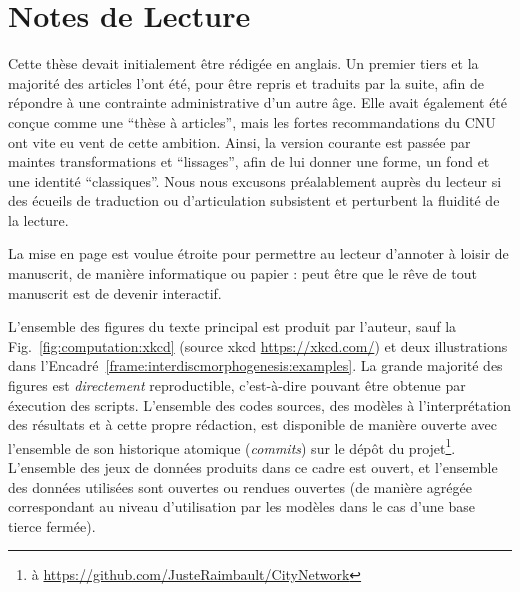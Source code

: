 



\begingroup
\let\clearpage\relax
\let\cleardoublepage\relax
\let\cleardoublepage\relax


\chapter*{Notes de Lecture}



Cette thèse devait initialement être rédigée en anglais. Un premier tiers et la majorité des articles l'ont été, pour être repris et traduits par la suite, afin de répondre à une contrainte administrative d'un autre âge. Elle avait également été conçue comme une ``thèse à articles'', mais les fortes recommandations du CNU ont vite eu vent de cette ambition. Ainsi, la version courante est passée par maintes transformations et ``lissages'', afin de lui donner une forme, un fond et une identité ``classiques''. Nous nous excusons préalablement auprès du lecteur si des écueils de traduction ou d'articulation subsistent et perturbent la fluidité de la lecture.

La mise en page est voulue étroite pour permettre au lecteur d'annoter à loisir de manuscrit, de manière informatique ou papier : peut être que le rêve de tout manuscrit est de devenir interactif.

L'ensemble des figures du texte principal est produit par l'auteur, sauf la Fig.~\ref{fig:computation:xkcd} (source xkcd \url{https://xkcd.com/}) et deux illustrations dans l'Encadré~\ref{frame:interdiscmorphogenesis:examples}. La grande majorité des figures est \emph{directement} reproductible, c'est-à-dire pouvant être obtenue par éxecution des scripts. L'ensemble des codes sources, des modèles à l'interprétation des résultats et à cette propre rédaction, est disponible de manière ouverte avec l'ensemble de son historique atomique (\emph{commits}) sur le dépôt du projet\footnote{à \url{https://github.com/JusteRaimbault/CityNetwork}}. L'ensemble des jeux de données produits dans ce cadre est ouvert, et l'ensemble des données utilisées sont ouvertes ou rendues ouvertes (de manière agrégée correspondant au niveau d'utilisation par les modèles dans le cas d'une base tierce fermée).


